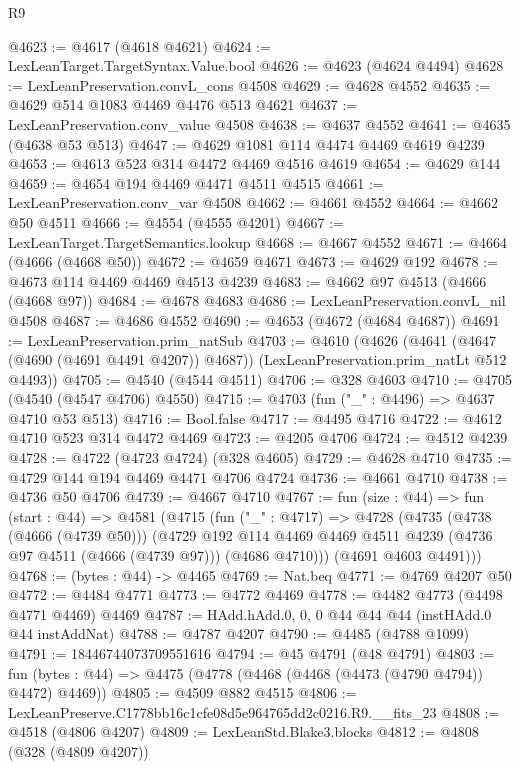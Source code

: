 \begin{lexlean}{R9}
\begin{coremodule}
@4623 := @4617 (@4618 @4621)
@4624 := LexLeanTarget.TargetSyntax.Value.bool
@4626 := @4623 (@4624 @4494)
@4628 := LexLeanPreservation.convL_cons @4508
@4629 := @4628 @4552
@4635 := @4629 @514 @1083 @4469 @4476 @513 @4621
@4637 := LexLeanPreservation.conv_value @4508
@4638 := @4637 @4552
@4641 := @4635 (@4638 @53 @513)
@4647 := @4629 @1081 @114 @4474 @4469 @4619 @4239
@4653 := @4613 @523 @314 @4472 @4469 @4516 @4619
@4654 := @4629 @144
@4659 := @4654 @194 @4469 @4471 @4511 @4515
@4661 := LexLeanPreservation.conv_var @4508
@4662 := @4661 @4552
@4664 := @4662 @50 @4511
@4666 := @4554 (@4555 @4201)
@4667 := LexLeanTarget.TargetSemantics.lookup
@4668 := @4667 @4552
@4671 := @4664 (@4666 (@4668 @50))
@4672 := @4659 @4671
@4673 := @4629 @192
@4678 := @4673 @114 @4469 @4469 @4513 @4239
@4683 := @4662 @97 @4513 (@4666 (@4668 @97))
@4684 := @4678 @4683
@4686 := LexLeanPreservation.convL_nil @4508
@4687 := @4686 @4552
@4690 := @4653 (@4672 (@4684 @4687))
@4691 := LexLeanPreservation.prim_natSub
@4703 := @4610
    (@4626
      (@4641 (@4647 (@4690 (@4691 @4491 @4207)) @4687))
      (LexLeanPreservation.prim_natLt @512 @4493))
@4705 := @4540 (@4544 @4511)
@4706 := @328 @4603
@4710 := @4705 (@4540 (@4547 @4706) @4550)
@4715 := @4703 (fun ("_" : @4496) => @4637 @4710 @53 @513)
@4716 := Bool.false
@4717 := @4495 @4716
@4722 := @4612 @4710 @523 @314 @4472 @4469
@4723 := @4205 @4706
@4724 := @4512 @4239
@4728 := @4722 (@4723 @4724) (@328 @4605)
@4729 := @4628 @4710
@4735 := @4729 @144 @194 @4469 @4471 @4706 @4724
@4736 := @4661 @4710
@4738 := @4736 @50 @4706
@4739 := @4667 @4710
@4767 := fun (size : @44) =>
  fun (start : @44) =>
  @4581
    (@4715
      (fun ("_" : @4717) =>
      @4728
        (@4735
          (@4738 (@4666 (@4739 @50)))
          (@4729
            @192
            @114
            @4469
            @4469
            @4511
            @4239
            (@4736 @97 @4511 (@4666 (@4739 @97)))
            (@4686 @4710)))
        (@4691 @4603 @4491)))
@4768 := (bytes : @44) -> @4465
@4769 := Nat.beq
@4771 := @4769 @4207 @50
@4772 := @4484 @4771
@4773 := @4772 @4469
@4778 := @4482 @4773 (@4498 @4771 @4469) @4469
@4787 := HAdd.hAdd.{0, 0, 0} @44 @44 @44 (instHAdd.{0} @44 instAddNat)
@4788 := @4787 @4207
@4790 := @4485 (@4788 @1099)
@4791 := 18446744073709551616
@4794 := @45 @4791 (@48 @4791)
@4803 := fun (bytes : @44) => @4475 (@4778 (@4468 (@4468 (@4473 (@4790 @4794)) @4472) @4469))
@4805 := @4509 @882 @4515
@4806 := LexLeanPreserve.C1778bb16c1cfe08d5e964765dd2c0216.R9.__fits_23
@4808 := @4518 (@4806 @4207)
@4809 := LexLeanStd.Blake3.blocks
@4812 := @4808 (@328 (@4809 @4207))

\end{coremodule}
\end{lexlean}
